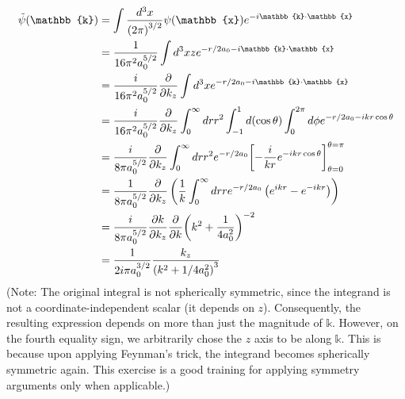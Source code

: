 \item

\begin{align*}
    \Tilde{\psi}(\mathbb{k})
    &= \int \frac{d^3 x}{{(2\pi)}^{3/2}} \psi(\mathbb{x}) e^{-i\mathbb{k} \cdot \mathbb{x}} \\
    &= \inv{16\pi^2 a_0^{5/2}} \int d^3 x z e^{-r/2a_0 - i\mathbb{k} \cdot \mathbb{x}} \\
    &= \frac{i}{16\pi^2 a_0^{5/2}} \partialderiv{k_z}
       \int d^3 x e^{-r/2a_0 - i\mathbb{k} \cdot \mathbb{x}} \\
    &= \frac{i}{16\pi^2 a_0^{5/2}} \partialderiv{k_z}
       \int_0^\infty dr r^2 \int_{-1}^1 d(\cos\theta) \int_0^{2\pi} d\phi e^{-r/2a_0 - ikr\cos\theta} \\
    &= \frac{i}{8\pi a_0^{5/2}} \partialderiv{k_z}
       \int_0^\infty dr r^2 e^{-r/2a_0} \diffBetween{-\frac{i}{kr}e^{-ikr\cos\theta}}{\theta=0}{\theta=\pi} \\
    &= \inv{8\pi a_0^{5/2}} \partialderiv{k_z}
       \left( \inv{k} \int_0^\infty dr r e^{-r/2a_0} \left( e^{ikr} - e^{-ikr} \right) \right) \\
    &= \frac{i}{8\pi a_0^{5/2}} \frac{\partial k}{\partial k_z} \partialderiv{k}
       {\left( k^2 + \inv{4a_0^2} \right)}^{-2} \\
    &= \inv{2i\pi a_0^{3/2}} \frac{k_z}{{\left( k^2 + 1/4a_0^2 \right)}^3}
\end{align*}
(Note: The original integral is not spherically symmetric,
since the integrand is not a coordinate-independent scalar (it depends on $z$).
Consequently, the resulting expression depends on more than just the magnitude of $\mathbb{k}$.
However, on the fourth equality sign, we arbitrarily chose the $z$ axis to be along $\mathbb{k}$.
This is because upon applying Feynman's trick, the integrand becomes spherically symmetric again.
This exercise is a good training for applying symmetry arguments only when applicable.)